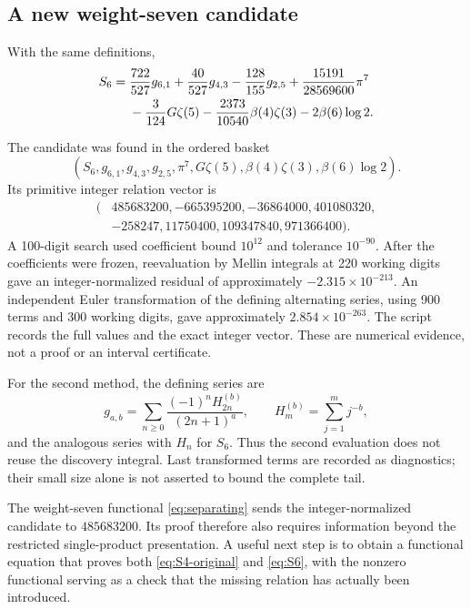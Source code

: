 \subsection{A new weight-seven candidate}

\begin{conjecture}\label{conj:S6}
With the same definitions,
\begin{align}
 S_6={}&\frac{722}{527}g_{6,1}
       +\frac{40}{527}g_{4,3}
       -\frac{128}{155}g_{2,5}
       +\frac{15191}{28569600}\pi^7\notag\\
      &-\frac3{124}G\zeta(5)
       -\frac{2373}{10540}\beta(4)\zeta(3)
       -2\beta(6)\log2. \label{eq:S6}
\end{align}
\end{conjecture}

The candidate was found in the ordered basket
\[
 (S_6,g_{6,1},g_{4,3},g_{2,5},\pi^7,
          G\zeta(5),\beta(4)\zeta(3),\beta(6)\log2).
\]
Its primitive integer relation vector is
\[
 \begin{split}
 (&485683200,-665395200,-36864000,401080320,\\
  &-258247,11750400,109347840,971366400).
 \end{split}
\]
A 100-digit search used coefficient bound \(10^{12}\) and tolerance
\(10^{-90}\). After the coefficients were frozen, reevaluation by
Mellin integrals at 220 working digits gave an integer-normalized
residual of approximately \(-2.315\times10^{-213}\).
An independent Euler transformation of the defining alternating
series, using 900 terms and 300 working digits, gave approximately
\(2.854\times10^{-263}\). The script records the full values and
the exact integer vector. These are numerical evidence, not a proof
or an interval certificate.

For the second method, the defining series are
\[
 g_{a,b}=\sum_{n\geq0}
       \frac{(-1)^nH_{2n}^{(b)}}{(2n+1)^a},
 \qquad H_m^{(b)}=\sum_{j=1}^{m}j^{-b},
\]
and the analogous series with \(H_n\) for \(S_6\).
Thus the second evaluation does not reuse the discovery integral.
Last transformed terms are recorded as diagnostics; their small
size alone is not asserted to bound the complete tail.

The weight-seven functional \eqref{eq:separating} sends the
integer-normalized candidate to \(485683200\). Its proof therefore
also requires information beyond the restricted single-product
presentation. A useful next step is to obtain a functional equation
that proves both \eqref{eq:S4-original} and \eqref{eq:S6}, with the
nonzero functional serving as a check that the missing relation has
actually been introduced.

